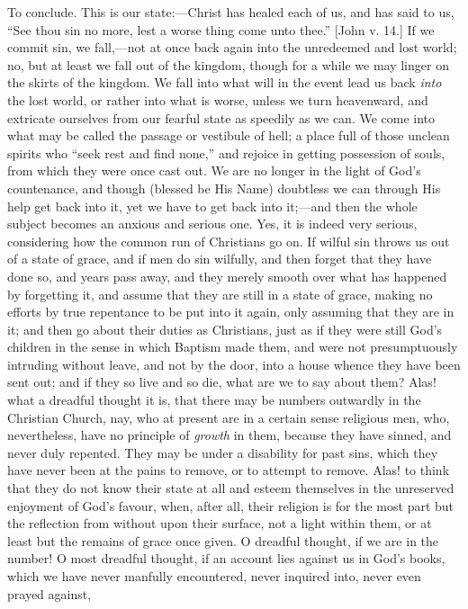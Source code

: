 To conclude. This is our state:—Christ has healed each of us, and
has said to us, ``See thou sin no more, lest a worse thing come
unto thee.'' [John v. 14.] If we commit sin, we fall,—not
at once back again into the unredeemed and lost world; no, but at
least we fall out of the kingdom, though for a while we may linger on
the skirts of the kingdom. We fall into what will in the event lead us
back \emph{into} the lost world, or rather into what is worse, unless
we turn heavenward, and extricate ourselves from our fearful state as
speedily as we can. We come into what may be called the passage or
vestibule of hell; a place full of those unclean spirits who
``seek rest and find none,'' and rejoice in getting possession
of souls, from which they were once cast out. We are no longer in the
light of God's countenance, and though (blessed be His Name) doubtless
we can through His help get back into it, yet we have to get back into
it;—and then the whole subject becomes an anxious and serious one.
Yes, it is indeed very serious, considering how the common run of
Christians go on. If wilful sin throws us out of a state of grace, and
if men do sin wilfully, and then forget that they have done so, and
years pass away, and they merely smooth over what has happened by
forgetting it, and assume that they are still in a state of grace,
making no efforts by true repentance to be put into it again, only
assuming that they are in it; and then go about their duties as
Christians, just as if they were still God's children in the sense in
which Baptism made them, and were not presumptuously intruding without
leave, and not by the door, into a house whence they have been sent
out; and if they so live and so die, what are we to say about them?
Alas! what a dreadful thought it is, that there may be numbers
outwardly in the Christian Church, nay, who at present are in a
certain sense religious men, who, nevertheless, have no principle of \emph{growth}
in them, because they have sinned, and never duly repented. They may
be under a disability for past sins, which they have never been at the
pains to remove, or to attempt to remove. Alas! to think that they do
not know their state at all and esteem themselves in the unreserved
enjoyment of God's favour, when, after all, their religion is for the
most part but the reflection from without upon their surface, not a
light within them, or at least but the remains of grace once given. O
dreadful thought, if we are in the number! O most dreadful thought, if
an account lies against us in God's books, which we have never
manfully encountered, never inquired into, never even prayed against,
